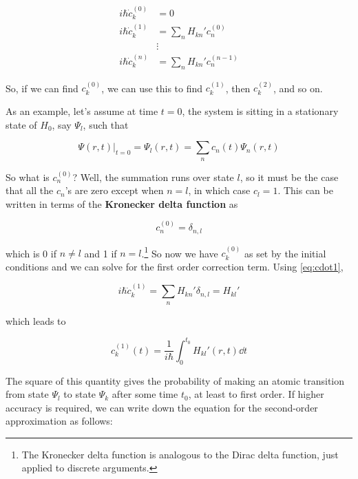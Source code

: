 \begin{align}
	i\hbar \dot{c}_k^{(0)} &= 0 \label{eq:cdot0} \\
	i\hbar \dot{c}_k^{(1)} &= \sum_n H_{kn}' c_n^{(0)} \label{eq:cdot1} \\
	&\vdots \nonumber \\
	i\hbar \dot{c}_k^{(n)} &= \sum_n H_{kn}' c_n^{(n-1)} \label{eq:cdotn}
\end{align}

So, if we can find $c_k^{(0)}$, we can use this to find $c_k^{(1)}$, then $c_k^{(2)}$, and so on.

As an example, let's assume at time $t = 0$, the system is sitting in a stationary state of $H_0$, say $\Psi_l$, such that

\begin{equation*}
	\Psi(r,t)|_{t=0} = \Psi_l(r,t) = \sum_n c_n(t) \Psi_n(r,t)
\end{equation*}

So what is $c_n^{(0)}$? 
Well, the summation runs over state $l$, so it must be the case that all the $c_n$'s are zero except when $n = l$, in which case $c_l = 1$. 
This can be written in terms of the \textbf{Kronecker delta function} as

\begin{equation}
	c_n^{(0)} = \delta_{n,l}
\end{equation}

\noindent which is 0 if $n\neq l$ and 1 if $n = l$.\footnote{The Kronecker delta function is analogous to the Dirac delta function, just applied to discrete arguments.} 
So now we have $c_k^{(0)}$ as set by the initial conditions and we can solve for the first order correction term. 
Using \autoref{eq:cdot1}, 

\begin{equation}
	i\hbar \dot{c}_k^{(1)} = \sum_n H_{kn}' \delta_{n,l} = H_{kl}'
\end{equation}

\noindent which leads to

\begin{tcolorbox}[title = First order perturbation coefficient] \vspace{-2ex}
	\begin{equation}
		c_k^{(1)}(t) = \frac{1}{i\hbar} \int_{0}^{t_0} H_{kl}'(r,t) \dd{t} \label{eq:c1}
	\end{equation}
\end{tcolorbox}

The square of this quantity gives the probability of making an atomic transition from state $\Psi_l$ to state $\Psi_k$ after some time $t_0$, at least to first order. 
If higher accuracy is required, we can write down the equation for the second-order approximation as follows:

